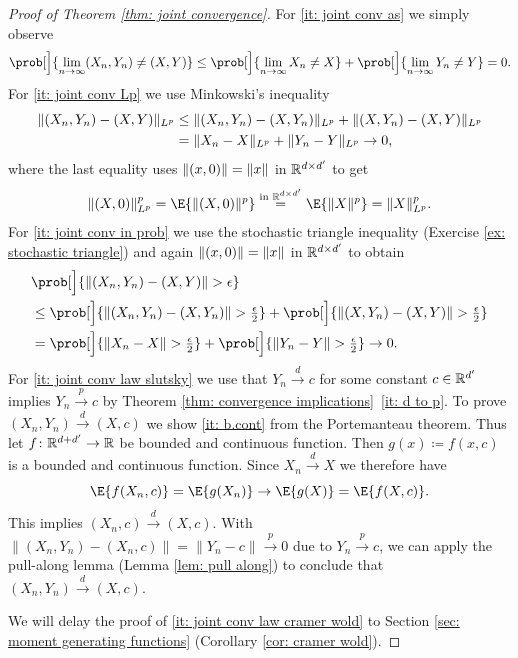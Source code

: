 \begin{proof}[Proof of Theorem \ref{thm: joint convergence}]
    For \ref{it: joint conv as} we simply observe
    \[
        \prob[\Big]{\lim_{n\to \infty} (X_n, Y_n) \neq (X,Y)}
        \le \prob[\Big]{\lim_{n\to \infty} X_n \neq X} + \prob[\Big]{\lim_{n\to \infty} Y_n \neq Y} = 0.
    \]
    For \ref{it: joint conv Lp} we use Minkowski's inequality
    \[\begin{aligned}
        \lVert(X_n, Y_n) - (X,Y)\rVert_{L^p}
        &\le \lVert(X_n, Y_n) - (X,Y_n)\rVert_{L^p} + \lVert(X,Y_n) - (X,Y)\rVert_{L^p}
        \\
        &= \lVert X_n - X\rVert_{L^p} + \lVert Y_n - Y\rVert_{L^p} \to 0,
    \end{aligned}\]
    where the last equality uses \(\lVert(x, 0)\rVert = \lVert x\rVert\) in \(\mathbb{R}^{d\times d'}\) to get
    \[
        \|(X,0)\|_{L^p}^p = \E{\|(X,0)\|^p} \overset{\text{in }\real^{\dims\times \dims'}}= \E{\|X\|^p} = \|X\|_{L^p}^p.
    \]
    For \ref{it: joint conv in prob} we use the stochastic triangle inequality (Exercise \ref{ex: stochastic triangle})
    and again \(\lVert(x, 0)\rVert = \lVert x\rVert\) in \(\mathbb{R}^{d\times d'}\)
    to obtain
    \[\begin{aligned}
        &\prob[\Big]{\norm{(X_n, Y_n) - (X,Y)} > \epsilon}
        \\
        &\le \prob[\Big]{\norm{(X_n, Y_n) - (X,Y_n)} > \tfrac\epsilon2}
        + \prob[\Big]{\norm{(X,Y_n) - (X,Y)} > \tfrac\epsilon2}
        \\
        &= \prob[\Big]{\norm{X_n - X} > \tfrac\epsilon2}
        + \prob[\Big]{\norm{Y_n - Y} > \tfrac\epsilon2} \to 0.
    \end{aligned}\]
    For \ref{it: joint conv law slutsky} we use that \(Y_n \overset{d}\to c\)
    for some constant \(c\in \mathbb{R}^{d'}\) implies \(Y_n \overset{p}\to c\)
    by Theorem \ref{thm: convergence implications}~\ref{it: d to p}. To prove
    \((X_n, Y_n) \overset{d}\to (X,c)\) we show \ref{it: b.cont} from the Portemanteau
    theorem. Thus let \(f\colon \mathbb{R}^{d + d'} \to \mathbb{R}\) be bounded
    and continuous function. Then \(g(x) \coloneq f(x,c)\) is a bounded
    and continuous function. Since \(X_n \overset{d}\to X\) we therefore have
    \[
        \E{f(X_n, c)} = \E{g(X_n)} \to \E{g(X)} = \E{f(X,c)}.
    \]
    This implies \((X_n, c) \overset{d}\to (X,c)\). With 
    \(\|(X_n, Y_n) - (X_n, c)\| = \|Y_n - c\| \overset{p}\to 0\)
    due to \(Y_n \overset{p}\to c\), we can apply the
    pull-along lemma (Lemma \ref{lem: pull along}) to conclude that \((X_n, Y_n)
    \overset{d}\to (X,c)\).

    We will delay the proof of \ref{it: joint conv law cramer wold} to Section \ref{sec: moment generating functions}
    (Corollary \ref{cor: cramer wold}).
\end{proof}

